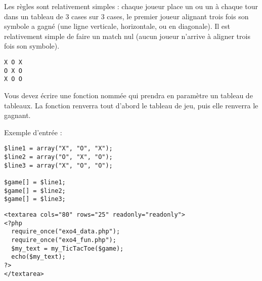 

\vspace*{0.7cm}

\noindent {}

\bigskip

\noindent Les règles sont relativement simples : chaque joueur place un  ou un  à chaque tour dans un tableau de 3 cases sur 3 cases, le premier joueur alignant trois fois son symbole a gagné (une ligne verticale, horizontale, ou en diagonale).
Il est relativement simple de faire un match nul (aucun joueur n'arrive à aligner trois fois son symbole).

\lstset{language=sh}
\begin{lstlisting}[frame=single,title={Exemple de jeu où le joueur X a gagné par la diagonale}]
X O X
O X O
X O O
\end{lstlisting}

\noindent Vous devez écrire une fonction nommée  qui prendra en paramètre un tableau de tableaux.
La fonction renverra tout d'abord le tableau de jeu, puis elle renverra le gagnant.

\bigskip

\noindent Exemple d'entrée :

\lstset{language=php}
\begin{lstlisting}[frame=single,title={Exemple de tableau de jeu (exo4\_data.php)}]
$line1 = array("X", "O", "X");
$line2 = array("O", "X", "O");
$line3 = array("X", "O", "O");

$game[] = $line1;
$game[] = $line2;
$game[] = $line3;
\end{lstlisting}

\lstset{language=php}
\begin{lstlisting}[frame=single,title={Appel de la fonction}]
<textarea cols="80" rows="25" readonly="readonly">
<?php
  require_once("exo4_data.php");
  require_once("exo4_fun.php");
  $my_text = my_TicTacToe($game);
  echo($my_text);
?>
</textarea>
\end{lstlisting}

\bigskip

